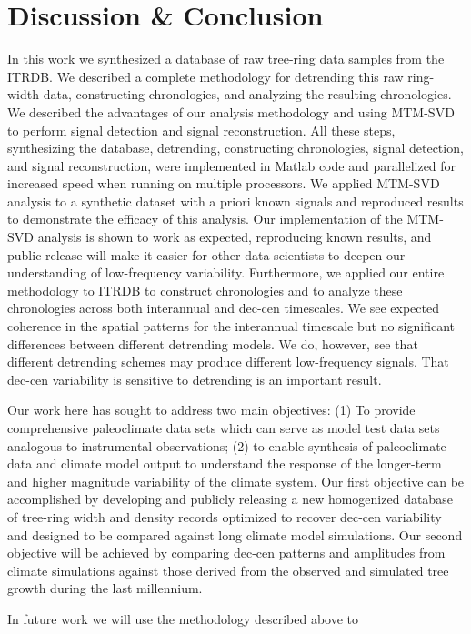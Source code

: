 \documentclass[phd,tocprelim]{cornell}
\begin{document}
\section{Discussion \& Conclusion}
In this work we synthesized a database of raw tree-ring 
data samples from the ITRDB. We described a complete 
methodology for detrending this raw ring-width data, 
constructing chronologies, and analyzing the resulting 
chronologies. We described the advantages of our analysis 
methodology and using MTM-SVD to perform signal detection 
and signal reconstruction. All these steps, synthesizing 
the database, detrending, constructing chronologies, 
signal detection, and signal reconstruction, were implemented 
in Matlab code and parallelized for increased speed when 
running on multiple processors. We applied MTM-SVD analysis 
to a synthetic dataset with a priori known signals and 
reproduced results to demonstrate the efficacy of this analysis. 
Our implementation of the MTM-SVD analysis is shown to work as 
expected, reproducing known results, and public release will 
make it easier for other data scientists to deepen our understanding 
of low-frequency variability. Furthermore, we applied our entire 
methodology to ITRDB to construct chronologies and to analyze 
these chronologies across both interannual and dec-cen timescales. 
We see expected coherence in the spatial patterns for the interannual 
timescale but no significant differences between different detrending 
models. We do, however, see that different detrending schemes 
may produce different low-frequency signals. That dec-cen variability 
is sensitive to detrending is an important result.
\par
Our work here has sought to address two main objectives: 
(1) To provide comprehensive paleoclimate data sets which  
can serve as model test data sets analogous to instrumental 
observations; (2) to enable synthesis of paleoclimate data 
and climate model output to understand the response of the 
longer-term and higher magnitude variability of the climate 
system. Our first objective can be accomplished by developing 
and publicly releasing a new homogenized database of tree-ring 
width and density records optimized to recover dec-cen 
variability and designed to be compared against long climate 
model simulations. Our second objective will be achieved by 
comparing dec-cen patterns and amplitudes from climate 
simulations against those derived from the observed and 
simulated tree growth during the last millennium.
\par
In future work we will use the methodology described above to
\end{document}
